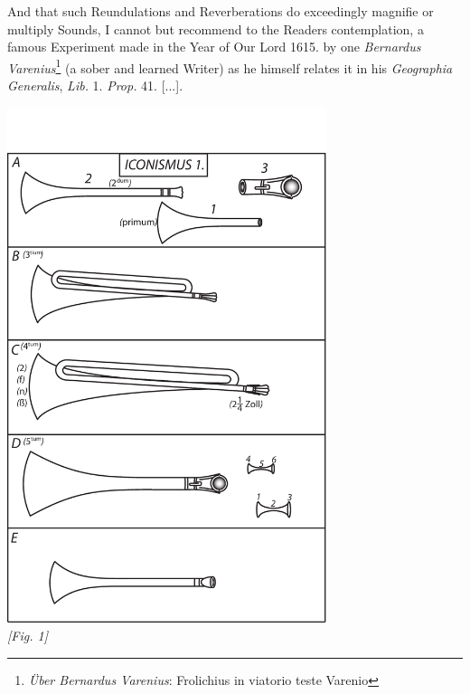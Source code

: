 \pstart [p.~11] And that such Reundulations and Reverberations do exceedingly magnifie or multiply Sounds\protect{}, I cannot but recommend to the Readers contemplation, a famous Experiment made in the Year of Our Lord 1615. by one \textit{Bernardus Varenius}\protect{}\footnote{\textit{\"{U}ber Bernardus Varenius}\protect{}: Frolichius\protect{} in viatorio teste Varenio\protect{}\relax} (a sober and learned Writer) as he himself relates it in his \textit{Geographia Generalis}, \textit{Lib.} 1. \textit{Prop.} 41. [...].\pend \newpage
   \begin{center}
   \includegraphics[width=0.7\textwidth]{images/tubus_morlandi.pdf}
   \\ \textit{[Fig. 1]}
   \end{center}